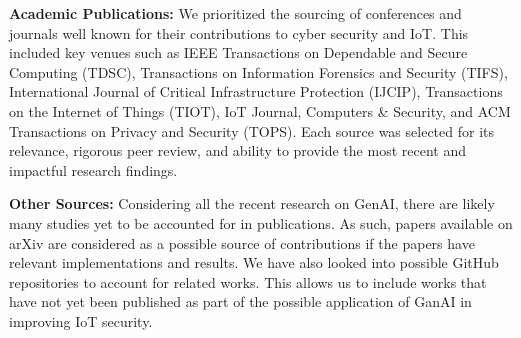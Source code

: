 \smallskip
\textbf{Academic Publications: } We prioritized the sourcing of conferences and journals well known for their contributions to cyber security and IoT.
This included key venues such as IEEE Transactions on Dependable and Secure Computing (TDSC), Transactions on Information Forensics and Security (TIFS), International Journal of Critical Infrastructure Protection (IJCIP), Transactions on the Internet of Things (TIOT), IoT Journal, Computers \& Security, and ACM Transactions on Privacy and Security (TOPS).
Each source was selected for its relevance, rigorous peer review, and ability to provide the most recent and impactful research findings.

\smallskip
\textbf{Other Sources: } Considering all the recent research on GenAI, there are likely many studies yet to be accounted for in publications.
As such, papers available on arXiv are considered as a possible source of contributions if the papers have relevant implementations and results.
We have also looked into possible GitHub repositories to account for related works.
This allows us to include works that have not yet been published as part of the possible application of GanAI in improving IoT security.